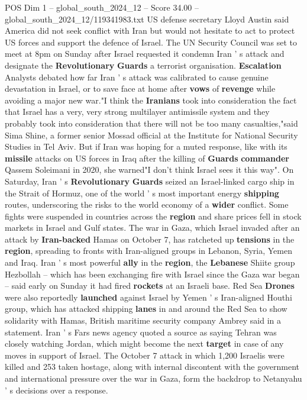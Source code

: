 \begin{textsample}{POS Dim 1 – global\_south\_2024\_12 – Score 34.00 – global\_south\_2024\_12/119341983.txt}
US defense secretary Lloyd Austin said America did not seek conflict with Iran but would not hesitate to act to protect US forces and support the defence of Israel.
The UN Security Council was set to meet at 8pm on Sunday after Israel requested it condemn Iran ' s attack and designate the \textbf{Revolutionary} \textbf{Guards} a terrorist organisation. \textbf{Escalation} Analysts debated how far Iran ' s attack was calibrated to cause genuine devastation in Israel, or to save face at home after \textbf{vows} of \textbf{revenge} while avoiding a major new war."I think the \textbf{Iranians} took into consideration the fact that Israel has a very, very strong multilayer antimissile system and they probably took into consideration that there will not be too many casualties,"said Sima Shine, a former senior Mossad official at the Institute for National Security Studies in Tel Aviv.
But if Iran was hoping for a muted response, like with its \textbf{missile} attacks on US forces in Iraq after the killing of \textbf{Guards} \textbf{commander} Qassem Soleimani in 2020, she warned"I don't think Israel sees it this way".
On Saturday, Iran ' s \textbf{Revolutionary} \textbf{Guards} seized an Israel-linked cargo ship in the Strait of Hormuz, one of the world ' s most important energy \textbf{shipping} routes, underscoring the risks to the world economy of a \textbf{wider} conflict.
Some fights were suspended in countries across the \textbf{region} and share prices fell in stock markets in Israel and Gulf states.
The war in Gaza, which Israel invaded after an attack by \textbf{Iran-backed} Hamas on October 7, has ratcheted up \textbf{tensions} in the \textbf{region}, spreading to fronts with Iran-aligned groups in Lebanon, Syria, Yemen and Iraq.
Iran ' s most powerful \textbf{ally} in the \textbf{region}, the \textbf{Lebanese} Shiite group Hezbollah -- which has been exchanging fire with Israel since the Gaza war began -- said early on Sunday it had fired \textbf{rockets} at an Israeli base.
Red Sea \textbf{Drones} were also reportedly \textbf{launched} against Israel by Yemen ' s Iran-aligned Houthi group, which has attacked shipping \textbf{lanes} in and around the Red Sea to show solidarity with Hamas, British maritime security company Ambrey said in a statement.
Iran ' s Fars news agency quoted a source as saying Tehran was closely watching Jordan, which might become the next \textbf{target} in case of any moves in support of Israel.
The October 7 attack in which 1,200 Israelis were killed and 253 taken hostage, along with internal discontent with the government and international pressure over the war in Gaza, form the backdrop to Netanyahu ' s decisions over a response.

\end{textsample}
